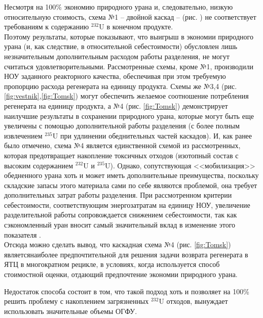 Несмотря на 100\% экономию природного урана и, следовательно, низкую относительную стоимость, схема №1  -- двойной каскад -- (рис. ) не соответствует требованиям к содержанию $^{232}$U в конечном продукте.\\
Поэтому результаты, которые показывают, что выигрыш в экономии природного урана (и, как следствие, в относительной себестоимости) обусловлен лишь незначительным дополнительным расходом работы разделения, не могут считаться удовлетворительными.
Рассмотренные схемы, кроме №1, производили НОУ заданного реакторного качества, обеспечивая при этом требуемую пропорцию расхода регенерата на единицу продукта.
Схемы же №3,4 (рис. \ref{fig:vestnik},\ref{fig:Tomsk}) могут обеспечить желаемое соотношение потребления регенерата на единицу продукта, а №4 (рис. \ref{fig:Tomsk}) демонстрирует наилучшие результаты в сохранении природного урана, которые могут быть еще увеличены с помощью дополнительной работы разделения (с более полным извлечением $^{235}$U при удлинении обеднительных частей каскадов).
И, как ранее было отмечено, схема №4 является единственной схемой из рассмотренных, которая предотвращает накопление токсичных отходов (изотопный состав с высоким содержанием $^{232}$U и $^{235}$U).
Однако, сопутствующая <<мобилизация>> обедненного урана хоть и может иметь дополнительные преимущества, поскольку складские запасы этого материала сами по себе являются проблемой, она требует дополнительных затрат работы разделения\cite{fitchOPTIONSDISPOSALREAPPLICATION2009}.
При рассмотренном критерии себестоимости, соответствующим энергозатратам на единицу НОУ, увеличение разделительной работы сопровождается снижением себестоимости, так как сэкономленный уран вносит самый значительный вклад в изменение этого показателя \cite{gusevMultycascadeEnrichmentSchemes2020}. \\
Отсюда можно сделать вывод, что каскадная схема №4 (рис. \ref{fig:Tomsk}) являетсянаиболее предпочтительной для решения задачи возврата регенерата в ЯТЦ в многократном рецикле, в условиях, когда используется способ стоимостной оценки, отдающий предпочтение экономии природного урана.

Недостаток способа состоит в том, что такой подход хоть и позволяет на 100\% решить проблему с накоплением загрязненных $^{232}$U отходов, вынуждает использовать значительные объемы ОГФУ.



